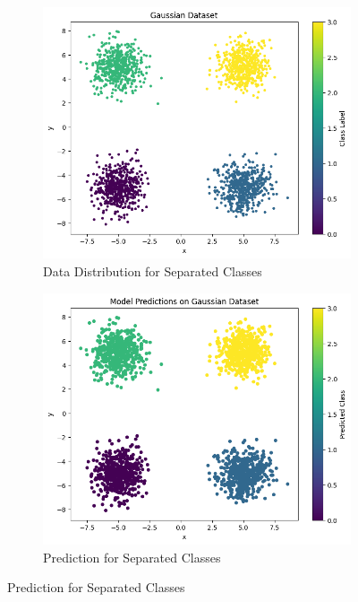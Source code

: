 \documentclass{article}
\begin{document}
\begin{figure}[ht]
  \centering
  \begin{subfigure}{0.4\textwidth}
    \includegraphics[width=\textwidth]{images/q1_data_dist_sep_45.png}
    \caption{Data Distribution for Separated Classes}
  \end{subfigure}
  \hspace{0.5cm}
  \begin{subfigure}{0.4\textwidth}
    \includegraphics[width=\textwidth]{images/q1_pred_dist_sep_45.png}
    \caption{Prediction for Separated Classes}
  \end{subfigure}
  

\end{figure}
\end{document}
